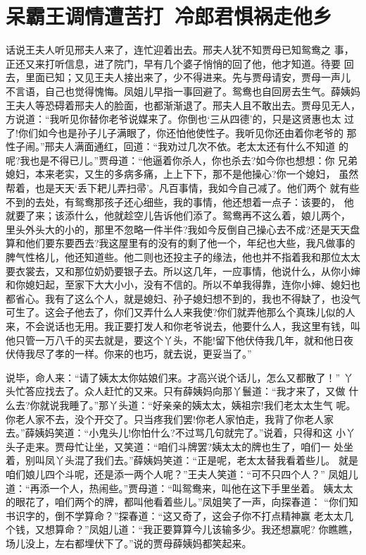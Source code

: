 \chapter{呆霸王调情遭苦打~冷郎君惧祸走他乡}

话说王夫人听见邢夫人来了，连忙迎着出去。邢夫人犹不知贾母已知鸳鸯之
事，正还又来打听信息，进了院门，早有几个婆子悄悄的回了他，他才知道。待要
回去，里面已知；又见王夫人接出来了，少不得进来。先与贾母请安，贾母一声儿
不言语，自己也觉得愧悔。凤姐儿早指一事回避了。鸳鸯也自回房去生气。薛姨妈
王夫人等恐碍着邢夫人的脸面，也都渐渐退了。邢夫人且不敢出去。贾母见无人，
方说道：“我听见你替你老爷说媒来了。你倒也‘三从四德’的，只是这贤惠也太
过了!你们如今也是孙子儿子满眼了，你还怕他使性子。我听见你还由着你老爷的
那性子闹。”邢夫人满面通红，回道：“我劝过几次不依。老太太还有什么不知道
的呢?我也是不得已儿。”贾母道：“他逼着你杀人，你也杀去?如今你也想想：你
兄弟媳妇，本来老实，又生的多病多痛，上上下下，那不是他操心?你一个媳妇，
虽然帮着，也是天天‘丢下耙儿弄扫帚’。凡百事情，我如今自己减了。他们两个
就有些不到的去处，有鸳鸯那孩子还心细些，我的事情，他还想着一点子：该要的，
他就要了来；该添什么，他就趁空儿告诉他们添了。鸳鸯再不这么着，娘儿两个，
里头外头大的小的，那里不忽略一件半件?我如今反倒自己操心去不成?还是天天盘
算和他们要东要西去?我这屋里有的没有的剩了他一个，年纪也大些，我凡做事的
脾气性格儿，他还知道些。他二则也还投主子的缘法，他也并不指着我和那位太太
要衣裳去，又和那位奶奶要银子去。所以这几年，一应事情，他说什么，从你小婶
和你媳妇起，至家下大大小小，没有不信的。所以不单我得靠，连你小婶、媳妇也
都省心。我有了这么个人，就是媳妇、孙子媳妇想不到的，我也不得缺了，也没气
可生了。这会子他去了，你们又弄什么人来我使?你们就弄他那么个真珠儿似的人
来，不会说话也无用。我正要打发人和你老爷说去，他要什么人，我这里有钱，叫
他只管一万八千的买去就是，要这个丫头，不能!留下他伏侍我几年，就和他日夜
伏侍我尽了孝的一样。你来的也巧，就去说，更妥当了。”

说毕，命人来：“请了姨太太你姑娘们来。才高兴说个话儿，怎么又都散了！”
丫头忙答应找去了。众人赶忙的又来。只有薛姨妈向那丫鬟道：“我才来了，又做
什么去?你就说我睡了。”那丫头道：“好亲亲的姨太太，姨祖宗!我们老太太生气
呢。你老人家不去，没个开交了。只当疼我们罢!你老人家怕走，我背了你老人家
去。”薛姨妈笑道：“小鬼头儿!你怕什么?不过骂几句就完了。”说着，只得和这
小丫头子走来。贾母忙让坐，又笑道：“咱们斗牌罢?姨太太的牌也生了，咱们一
处坐着，别叫凤丫头混了我们去。”薛姨妈笑道：“正是呢，老太太替我看着些儿。
就是咱们娘儿四个斗呢，还是添一两个人呢？”王夫人笑道：“可不只四个人？”
凤姐儿道：“再添一个人，热闹些。”贾母道：“叫鸳鸯来，叫他在这下手里坐着。
姨太太的眼花了，咱们两个的牌，都叫他看着些儿。”凤姐笑了一声，向探春道：
“你们知书识字的，倒不学算命？”探春道：“这又奇了，这会子你不打点精神赢
老太太几个钱，又想算命？”凤姐儿道：“我正要算算今儿该输多少。我还想赢呢?
你瞧瞧，场儿没上，左右都埋伏下了。”说的贾母薛姨妈都笑起来。

